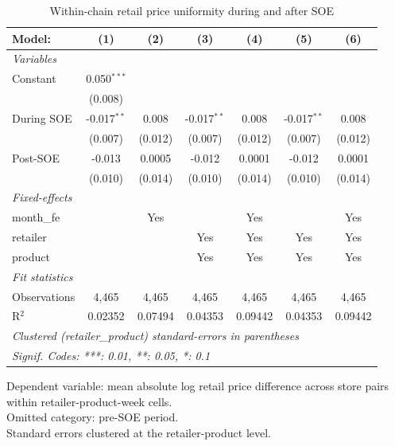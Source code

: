 
\begin{table}[htbp]
   \caption{\label{tab:uniformity_retail} Within-chain retail price uniformity during and after SOE}
   \centering
   \begin{tabular}{lcccccc}
      \tabularnewline \midrule \midrule
      Model:       & (1)           & (2)     & (3)           & (4)     & (5)           & (6)\\  
      \midrule
      \emph{Variables}\\
      Constant     & 0.050$^{***}$ &         &               &         &               &   \\   
                   & (0.008)       &         &               &         &               &   \\   
      During SOE   & -0.017$^{**}$ & 0.008   & -0.017$^{**}$ & 0.008   & -0.017$^{**}$ & 0.008\\   
                   & (0.007)       & (0.012) & (0.007)       & (0.012) & (0.007)       & (0.012)\\   
      Post-SOE     & -0.013        & 0.0005  & -0.012        & 0.0001  & -0.012        & 0.0001\\   
                   & (0.010)       & (0.014) & (0.010)       & (0.014) & (0.010)       & (0.014)\\   
      \midrule
      \emph{Fixed-effects}\\
      month\_fe    &               & Yes     &               & Yes     &               & Yes\\  
      retailer     &               &         & Yes           & Yes     & Yes           & Yes\\  
      product      &               &         & Yes           & Yes     & Yes           & Yes\\  
      \midrule
      \emph{Fit statistics}\\
      Observations & 4,465         & 4,465   & 4,465         & 4,465   & 4,465         & 4,465\\  
      R$^2$        & 0.02352       & 0.07494 & 0.04353       & 0.09442 & 0.04353       & 0.09442\\  
      \midrule \midrule
      \multicolumn{7}{l}{\emph{Clustered (retailer\_product) standard-errors in parentheses}}\\
      \multicolumn{7}{l}{\emph{Signif. Codes: ***: 0.01, **: 0.05, *: 0.1}}\\
   \end{tabular}
   
   \par \raggedright 
   Dependent variable: mean absolute log retail price difference across store pairs within retailer-product-week cells.\\
   Omitted category: pre-SOE period.\\
   Standard errors clustered at the retailer-product level.
\end{table}


